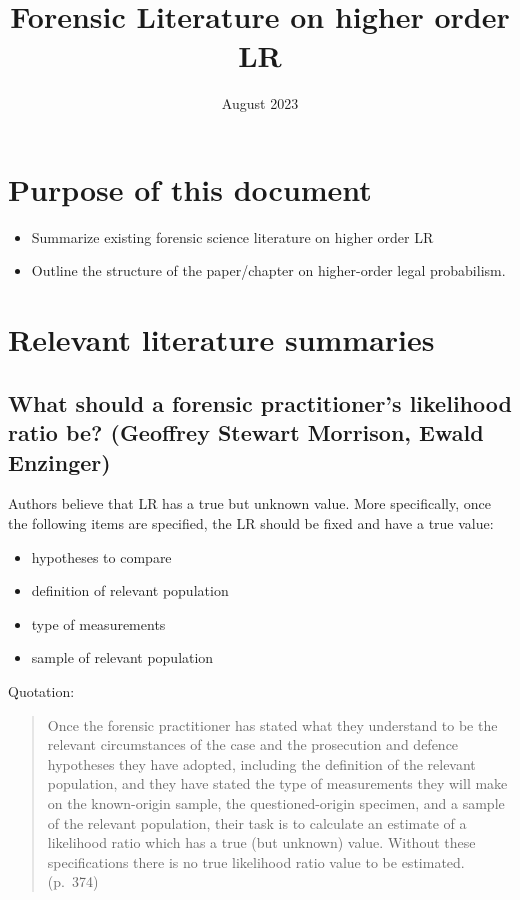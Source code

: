 \documentclass[
  10pt,
  dvipsnames,enabledeprecatedfontcommands]{scrartcl}
\title{Forensic Literature on higher order LR}
\author{}
\date{\vspace{-2.5em}August 2023}
\begin{document}
\maketitle

\hypertarget{purpose-of-this-document}{%
\section{Purpose of this document}\label{purpose-of-this-document}}

\begin{itemize}
\item
  Summarize existing forensic science literature on higher order LR
\item
  Outline the structure of the paper/chapter on higher-order legal
  probabilism.
\end{itemize}

\hypertarget{relevant-literature-summaries}{%
\section{Relevant literature
summaries}\label{relevant-literature-summaries}}

\hypertarget{what-should-a-forensic-practitioners-likelihood-ratio-be-geoffrey-stewart-morrison-ewald-enzinger}{%
\subsection{What should a forensic practitioner's likelihood ratio be?
(Geoffrey Stewart Morrison, Ewald
Enzinger)}\label{what-should-a-forensic-practitioners-likelihood-ratio-be-geoffrey-stewart-morrison-ewald-enzinger}}

Authors believe that LR has a true but unknown value. More specifically,
once the following items are specified, the LR should be fixed and have
a true value:

\begin{itemize}
\item
  hypotheses to compare
\item
  definition of relevant population
\item
  type of measurements
\item
  sample of relevant population
\end{itemize}

Quotation:

\begin{quote}
Once the forensic practitioner has stated what they understand to be the
relevant circumstances of the case and the prosecution and defence
hypotheses they have adopted, including the definition of the relevant
population, and they have stated the type of measurements they will make
on the known-origin sample, the questioned-origin specimen, and a sample
of the relevant population, their task is to calculate an estimate of a
likelihood ratio which has a true (but unknown) value. Without these
specifications there is no true likelihood ratio value to be estimated.
(p.~374)
\end{quote}
\end{document}
